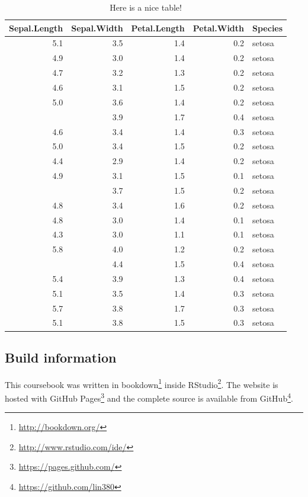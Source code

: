\documentclass[
]{article}
\DeclareRobustCommand{\href}[2]{#2\footnote{\url{#1}}}
\begin{document}
\begin{table}

\caption{\label{tab:test-tab}Here is a nice table!}
\centering
\begin{tabular}[t]{rrrrl}
\toprule
Sepal.Length & Sepal.Width & Petal.Length & Petal.Width & Species\\
\midrule
5.1 & 3.5 & 1.4 & 0.2 & setosa\\
4.9 & 3.0 & 1.4 & 0.2 & setosa\\
4.7 & 3.2 & 1.3 & 0.2 & setosa\\
4.6 & 3.1 & 1.5 & 0.2 & setosa\\
5.0 & 3.6 & 1.4 & 0.2 & setosa\\
\addlinespace
5.4 & 3.9 & 1.7 & 0.4 & setosa\\
4.6 & 3.4 & 1.4 & 0.3 & setosa\\
5.0 & 3.4 & 1.5 & 0.2 & setosa\\
4.4 & 2.9 & 1.4 & 0.2 & setosa\\
4.9 & 3.1 & 1.5 & 0.1 & setosa\\
\addlinespace
5.4 & 3.7 & 1.5 & 0.2 & setosa\\
4.8 & 3.4 & 1.6 & 0.2 & setosa\\
4.8 & 3.0 & 1.4 & 0.1 & setosa\\
4.3 & 3.0 & 1.1 & 0.1 & setosa\\
5.8 & 4.0 & 1.2 & 0.2 & setosa\\
\addlinespace
5.7 & 4.4 & 1.5 & 0.4 & setosa\\
5.4 & 3.9 & 1.3 & 0.4 & setosa\\
5.1 & 3.5 & 1.4 & 0.3 & setosa\\
5.7 & 3.8 & 1.7 & 0.3 & setosa\\
5.1 & 3.8 & 1.5 & 0.3 & setosa\\
\bottomrule
\end{tabular}
\end{table}

\hypertarget{build-information}{%
\subsection{Build information}\label{build-information}}

This coursebook was written in \href{http://bookdown.org/}{bookdown} inside \href{http://www.rstudio.com/ide/}{RStudio}. The website is hosted with \href{https://pages.github.com/}{GitHub Pages} and the complete source is available from \href{https://github.com/lin380}{GitHub}.
\end{document}
